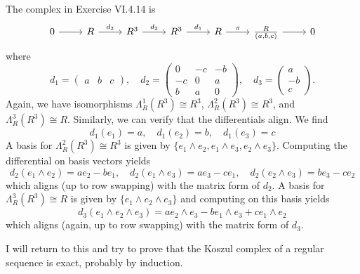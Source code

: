 \documentclass[../../master.tex]{subfiles}
\begin{document}
\begin{solution}
    The complex in Exercise VI.4.14 is
    \[
    \begin{tikzcd}
        0 & R & R^{3} & R^{3} & R & \frac{R}{(a, b, c)} & 0
        \arrow[from=1-1, to=1-2]
        \arrow[from=1-2, to=1-3, "d_3"]
        \arrow[from=1-3, to=1-4, "d_2"]
        \arrow[from=1-4, to=1-5, "d_1"]
        \arrow[from=1-5, to=1-6, "\pi"]
        \arrow[from=1-6, to=1-7] 
    \end{tikzcd}
    \]
    where
    \[
    d_1 = 
    \begin{pmatrix}
        a & b & c
    \end{pmatrix}, \quad
    d_2 =
    \begin{pmatrix}
        0 & -c & -b \\
        -c & 0 & a \\
        b & a & 0
    \end{pmatrix}, \quad
    d_3 = 
    \begin{pmatrix}
        a \\
        -b \\
        c
    \end{pmatrix}.
    \]
    Again, we have isomorphisms $\Lambda_R^{1}(R^{3}) \cong R^{3}$, $\Lambda_R^{2}(R^{3}) \cong R^3$, and $\Lambda_R^{3}(R^3) \cong R$.
    Similarly, we can verify that the differentials align.
    We find
    \[
    d_1(e_1) = a, \quad d_1(e_2) = b, \quad d_1(e_3) = c 
    \]
    A basis for $\Lambda_R^2(R^3) \cong R^3$ is given by $\{ e_1 \wedge e_2, e_1 \wedge e_3, e_2 \wedge e_3 \}$.
    Computing the differential on basis vectors yields
    \[
    d_2(e_1 \wedge e_2) = a e_2 - b e_1, \quad d_2(e_1 \wedge e_3) = a e_3 - c e_1, \quad d_2(e_2 \wedge e_3) = b e_3 - c e_2
    \]
    which aligns (up to row swapping) with the matrix form of $d_2$.
    A basis for $\Lambda_R^3(R^3) \cong R$ is given by $\{e_1 \wedge e_2 \wedge e_3\}$ and computing on this basis yields
    \[
    d_3(e_1 \wedge e_2 \wedge e_3) = a e_2 \wedge e_3 - b e_1 \wedge e_3 + c e_1 \wedge e_2
    \]
    which aligns (again, up to row swapping) with the matrix form of $d_3$.

    I will return to this and try to prove that the Koszul complex of a regular sequence is exact, probably by induction.
\end{solution}
\end{document}
